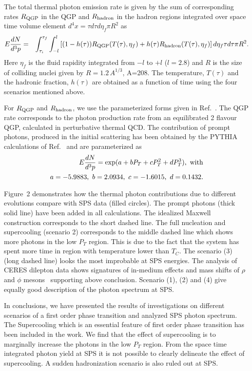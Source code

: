   The total thermal photon emission rate is given by the sum of 
corresponding rates $R_{\rm QGP}$ in the QGP and $R_{\rm hadron}$ 
in the hadron regions integrated over space time volume 
element $d^4x = \tau d\tau d\eta_f \pi R^2$ as
\begin{eqnarray}\label{}
 E \frac{dN}{d^3 p}  &=& \int_{\tau_i}^{\tau_f} \int_{-l}^{l} 
     \left[(1-h(\tau)) R_{\rm QGP}(T(\tau),\eta_f) 
  + h(\tau)  R_{\rm hadron}(T(\tau),\eta_f) \right]d\eta_f \tau d\tau \pi R^2.
\end{eqnarray}
Here $\eta_f$ is the fluid rapidity integrated from 
$-l$ to $+l$ ($l=2.8$) and $R$ is the size of colliding 
nuclei given by $R=1.2\, A^{1/3}$, A=208. 
 The temperature, $T(\tau)$ and the hadronic fraction, $h(\tau)$ are
obtained as a function of time using the four scenarios mentioned above. 

  For $R_{\rm QGP}$ and $R_{\rm hadron}$, we use the parameterized forms
given in Ref.~\cite{THOMA}. The QGP rate corresponds to 
the photon production rate from an equilibrated 2 flavour
QGP, calculated in perturbative thermal QCD.
  The contribution of prompt photons, produced in the initial 
scattering has been obtained by the PYTHIA
calculations of Ref.~\cite{GALLMEISTER} and are parameterized as
\begin{eqnarray}\label{promp}
E \frac{dN}{d^3 p} = \exp(a + bP_T + cP_T^2 + dP_T^3), \,\, {\rm with} \nonumber\\
  a=-5.9883,\,\, b=2.0934,\,\, c=-1.6015,\,\, d=0.1432.
\end{eqnarray}


   Figure~2 demonstrates how the thermal photon contributions due to 
different evolutions compare with SPS data (filled circles). The prompt 
photons (thick solid line) have been added in all calculations.
 The idealized Maxwell construction corresponds to the short dashed line.
The full nucleation and supercooling (scenario 2) corresponds to 
the middle dashed line which shows more photons in the low 
$P_T$ region. This is due to the fact that the system has spent more
time in region with temperature lower than $T_C$. 
  The scenario (3) (long dashed line) looks the most improbable at SPS 
energies. The analysis of CERES dilepton data shows signatures of 
in-medium effects and mass shifts of $\rho$ and $\phi$ mesons~\cite{RAPP} 
supporting above conclusion. 
 Scenario (1), (2) and (4) give equally good description of the photon
spectrum at SPS. 

  In conclusions, we have presented the results of investigations on 
different scenarios of a first order phase transition and analyzed
SPS photon spectrum. The Supercooling which is an essential 
feature of first order phase transition has been included in the work.
We find that the effect of supercooling is to marginally increase the 
photons in the low $P_T$ region. From the space time integrated 
photon yield at SPS it is not possible to clearly delineate the effect 
of supercooling. A sudden hadronization scenario is also ruled 
out at SPS. 


